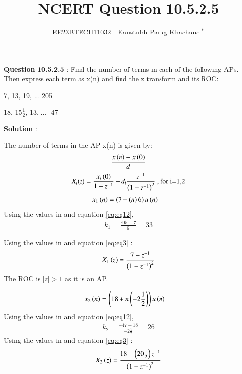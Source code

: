 \documentclass[journal,12pt,twocolumn]{IEEEtran}
\theoremstyle{remark}
\begin{document}

\vspace{3cm}

\Large\title{NCERT Question 10.5.2.5}
\large\author{EE23BTECH11032 - Kaustubh Parag Khachane $^{*}$%
}
\maketitle
\newpage
\bigskip

\renewcommand{\thefigure}{\theenumi}
\renewcommand{\thetable}{\theenumi}
\large\textbf{Question 10.5.2.5} : \normalsize Find the number of terms in each of the following APs. Then express each term as x(n) and find the z transform and its ROC: 

 7, 13, 19, ... 205

 18, 15$\frac{1}{2}$, 13, ... -47


\large\textbf{Solution} :\normalsize


The number of terms in the AP x(n) is given by: 
\begin{align}  \label{eq:eq12}
    \frac{x\left(n\right) - x\left(0\right)}{d}
    \end{align}
\begin{align}
    X_i(z) = \frac{x_i\left(0\right)}{1 - z^{-1}} + d_i\frac{z^{-1}}{\left(1-z^{-1}\right)^2} \text{ , for i=1,2} \label{eq:eq3}
\end{align}
\textbf{}
\begin{align}
x_{1}\left(n\right) &= \left(7 + \left(n\right)6\right)u\left(n\right)
\end{align}
Using the values in  and equation \eqref{eq:eq12},
\begin{align}
    k_1 = \frac{205 - 7}{6} = 33
\end{align}

Using the values in  and equation \eqref{eq:eq3} :
\begin{align}
 X_1\left(z\right) = \frac{7 - z^{-1}}{\left(1-z^{-1}\right)^2}
 \end{align}
 The ROC is $|z|>1$ as it is an AP.
 
\textbf{}
\begin{align}
x_{2}\left(n\right) &= \left(18 + n\left(-2\frac{1}{2}\right)\right)u\left(n\right)
 \end{align}
 Using the values in  and equation \eqref{eq:eq12},
\begin{align}
    k_2 = \frac{-47 - 18}{-2\frac{1}{2}} = 26
\end{align}
Using the values in  and equation \eqref{eq:eq3} :
\begin{align} 
 X_2\left(z\right) = \frac{18 - \left(20\frac{1}{2}\right)z^{-1}}{\left(1 - z^{-1}\right)^2}
\end{align}
\end{document}
